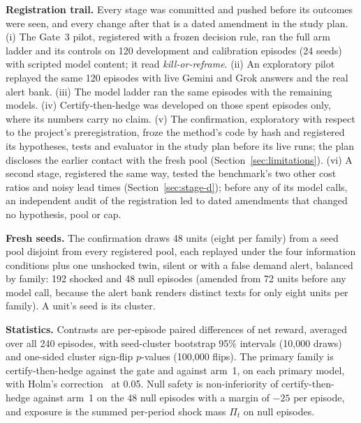 \textbf{Registration trail.} Every stage was committed and pushed before its outcomes were
seen, and every change after that is a dated amendment in the study plan. (i) The Gate~3 pilot,
registered with a frozen decision rule, ran the full arm ladder and its controls on 120 development and calibration
episodes (24 seeds) with scripted model content; it read \emph{kill-or-reframe}. (ii) An
exploratory pilot replayed the same 120 episodes with live Gemini and Grok answers and the real
alert bank. (iii) The model ladder ran the same episodes with the remaining models. (iv)
Certify-then-hedge was developed on those spent episodes only, where its numbers carry no
claim. (v) The confirmation, exploratory with respect to the project's preregistration, froze
the method's code by hash and registered its hypotheses, tests and evaluator in the study plan
before its live runs; the plan discloses the earlier contact with the fresh pool
(Section~\ref{sec:limitations}). (vi) A second stage, registered the same way, tested the
benchmark's two other cost ratios and noisy lead times (Section~\ref{sec:stage-d}); before
any of its model calls, an independent audit of the registration led to dated amendments that
changed no hypothesis, pool or cap.

\textbf{Fresh seeds.} The confirmation draws 48 units (eight per family) from a seed pool
disjoint from every registered pool, each replayed under the four information conditions plus
one unshocked twin, silent or with a false demand alert, balanced by family: 192 shocked and 48
null episodes (amended from 72 units before any model call, because the alert bank renders
distinct texts for only eight units per family). A unit's seed is its cluster.

\textbf{Statistics.} Contrasts are per-episode paired differences of net reward, averaged over
all 240 episodes, with seed-cluster bootstrap 95\% intervals (10{,}000 draws) and one-sided
cluster sign-flip $p$-values (100{,}000 flips). The primary family is certify-then-hedge against
the gate and against arm~1, on each primary model, with Holm's correction~\cite{holm-multitest}
at 0.05. Null safety is non-inferiority of certify-then-hedge against arm~1 on the 48 null
episodes with a margin of $-25$ per episode, and exposure is the summed per-period shock mass
$\Pi_t$ on null episodes.
